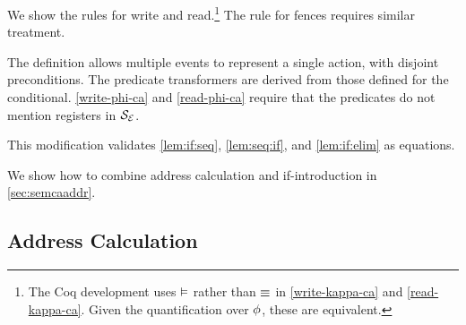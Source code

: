 
We show the rules for write and read.\footnote{The Coq development uses
  $\mathrel{\vDash}$ rather than $\mathrel{\equiv}$ in \ref{write-kappa-ca} and
  \ref{read-kappa-ca}.  Given the quantification over $\phi$, these are
  equivalent.}  The rule for fences requires similar treatment.

\noindent
\begin{minipage}{1.0\textwidth}
\begin{definition}
  \label{def:semca}
  
\end{definition}
\end{minipage}
\smallskip

\noindent
The definition allows multiple events to represent a single action, with
disjoint preconditions.  The predicate transformers are derived from those
defined for the conditional.
\ref{write-phi-ca} and \ref{read-phi-ca} require that the predicates do not
mention registers in $\mathcal{S}_{\mathcal{E}}$.


This modification validates
\ref{lem:if:seq}, \ref{lem:seq:if}, and \ref{lem:if:elim} as equations.

We show how to combine address calculation and if-introduction in
\textsection\ref{sec:semcaaddr}.

\subsection{Address Calculation}
\label{sec:addr}


